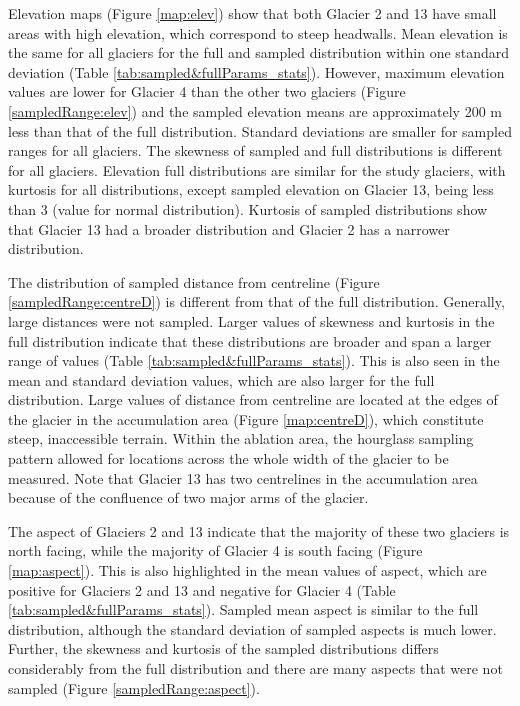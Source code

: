 \documentclass{sfuthesis}
\begin{document}
Elevation maps (Figure \ref{map:elev}) show that both Glacier 2 and 13 have small areas with high elevation, which correspond to steep headwalls. Mean elevation is the same for all glaciers for the full and sampled distribution within one standard deviation (Table \ref{tab:sampled&fullParams_stats}). However, maximum elevation values are lower for Glacier 4 than the other two glaciers (Figure \ref{sampledRange:elev}) and the sampled elevation means are approximately 200 m less than that of the full distribution. Standard deviations are smaller for sampled ranges for all glaciers. The skewness of sampled and full distributions is different for all glaciers. Elevation full distributions are similar for the study glaciers, with kurtosis for all distributions, except sampled elevation on Glacier 13, being less than 3 (value for normal distribution). Kurtosis of sampled distributions show that Glacier 13 had a broader distribution and Glacier 2 has a narrower distribution. 

The distribution of sampled distance from centreline (Figure \ref{sampledRange:centreD}) is different from that of the full distribution. Generally, large distances were not sampled. Larger values of skewness and kurtosis in the full distribution indicate that these distributions are broader and span a larger range of values (Table \ref{tab:sampled&fullParams_stats}). This is also seen in the mean and standard deviation values, which are also larger for the full distribution. Large values of distance from centreline are located at the edges of the glacier in the accumulation area (Figure \ref{map:centreD}), which constitute steep, inaccessible terrain. Within the ablation area, the hourglass sampling pattern allowed for locations across the whole width of the glacier to be measured. Note that Glacier 13 has two centrelines in the accumulation area because of the confluence of two major arms of the glacier.

The aspect of Glaciers 2 and 13 indicate that the majority of these two glaciers is north facing, while the majority of Glacier 4 is south facing (Figure \ref{map:aspect}). This is also highlighted in the mean values of aspect, which are positive for Glaciers 2 and 13 and negative for Glacier 4 (Table \ref{tab:sampled&fullParams_stats}). Sampled mean aspect is similar to the full distribution, although the standard deviation of sampled aspects is much lower. Further, the skewness and kurtosis of the sampled distributions differs considerably from the full distribution and there are many aspects that were not sampled (Figure \ref{sampledRange:aspect}). 
\end{document}
